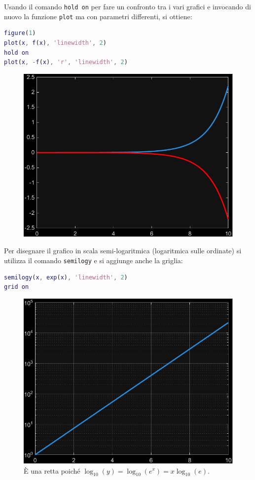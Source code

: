 \newpage

\noindent
Usando il comando \texttt{hold on} per fare un confronto tra i vari grafici e invocando di nuovo la funzione \texttt{plot} ma con parametri differenti, si ottiene:
\begin{lstlisting}[language=MATLAB]
figure(1)
plot(x, f(x), 'linewidth', 2)
hold on
plot(x, -f(x), 'r', 'linewidth', 2)\end{lstlisting}

\begin{figure}[!htp]
    \centering
    \includegraphics[width=.6\textwidth]{img/grafici-di-funzione-3.pdf}
\end{figure}

\noindent
{}

\highspace
Per disegnare il grafico in scala semi-logaritmica (logaritmica sulle ordinate) si utilizza il comando \texttt{semilogy} e si aggiunge anche la griglia:
\begin{lstlisting}[language=MATLAB]
semilogy(x, exp(x), 'linewidth', 2)
grid on\end{lstlisting}
\begin{figure}[!htp]
    \centering
    \includegraphics[width=.6\textwidth]{img/grafici-di-funzione-4.pdf}
    \caption*{È una retta poiché $\log_{10}\left(y\right) = \log_{10}\left(e^{x}\right) = x\log_{10}\left(e\right)$.}
\end{figure}

